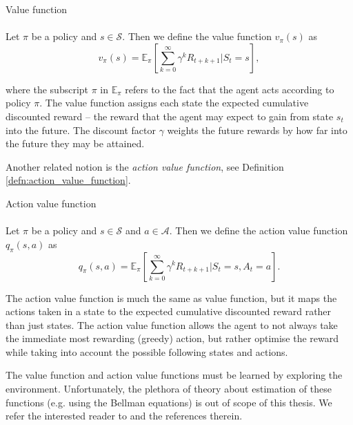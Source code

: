 \begin{defn}{Value function} \label{defn:value_function}
\\
\cite[Section 3.5]{sutton2018reinforcement}
\\
Let $\pi$ be a policy and $s \in \mathcal{S}$. Then we define the value function $v_{\pi}(s)$ as
\begin{equation*}
v_{\pi}(s)=\mathbb{E}_{\pi} \left[ \sum_{k=0}^{\infty} \gamma^k R_{t+k+1} | S_t=s \right],
\end{equation*}
\end{defn}
where the subscript $\pi$ in $\mathbb{E}_{\pi}$ refers to the fact that the agent acts according to policy $\pi$.
The value function assigns each state the expected cumulative discounted reward -- the reward that the agent may expect to gain from state $s_t$ into the future. The discount factor $\gamma$ weights the future rewards by how far into the future they may be attained.

Another related notion is the \textit{action value function}, see Definition \ref{defn:action_value_function}.

\begin{defn}{Action value function} \label{defn:action_value_function}
\\
\cite[Section 3.5]{sutton2018reinforcement}
\\
Let $\pi$ be a policy and $s \in \mathcal{S}$ and $a \in \mathcal{A}$. Then we define the action value function $q_{\pi}(s,a)$ as
\begin{equation*}
 q_{\pi}(s,a)=\mathbb{E}_{\pi} \left[ \sum_{k=0}^{\infty} \gamma^k R_{t+k+1} | S_t=s, A_t=a \right].
\end{equation*}
\end{defn}
The action value function is much the same as value function, but it maps the actions taken in a state to the expected cumulative discounted reward rather than just states. The action value function allows the agent to not always take the immediate most rewarding (greedy) action, but rather optimise the reward while taking into account the possible following states and actions. 

The value function and action value functions must be learned by exploring the environment. Unfortunately, the plethora of theory about estimation of these functions (e.g. using the Bellman equations) is out of scope of this thesis. We refer the interested reader to \cite[Section 3.5.]{sutton2018reinforcement} and the references therein.

